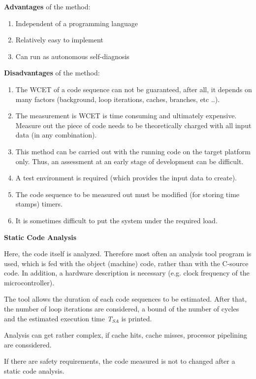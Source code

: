 \textbf{Advantages} of the method:

\begin{enumerate}
	\item  Independent of a programming language
	\item  Relatively easy to implement
	\item  Can run as autonomous self-diagnosis
\end{enumerate}

\textbf{Disadvantages} of the method:

\begin{enumerate}
	\item  The WCET of a code sequence can not be guaranteed, after all, it depends on many factors (background, loop iterations, caches, branches, etc ..).
	\item  The measurement is WCET is time consuming and ultimately expensive. Measure out the piece of code needs to be theoretically charged with all input data (in any combination).
	\item  This method can be carried out with the running code on the target platform only. Thus, an assessment at an early stage of development can be difficult.
	\item  A test environment is required (which provides the input data to create).
	\item  The code sequence to be measured out must be modified (for storing time stamps)  timers.
	\item  It is sometimes difficult to put the system under the required load.
\end{enumerate}

\textbf{ Static Code Analysis}

Here, the code itself is analyzed. Therefore most often an analysis tool program is used, which is fed with the object (machine) code, rather than with the C-source code. In addition, a hardware description is necessary (e.g. clock frequency of the microcontroller). 

The tool allows the duration of each code sequences to be estimated. After that, the number of loop iterations are considered, a bound of the number of cycles and the estimated execution time \textit{T${}_{SA}$} is printed.

Analysis can get rather complex, if cache hits, cache misses, processor pipelining are conssidered. 

If there are safety requirements, the code measured is not to changed after a static code analysis.

